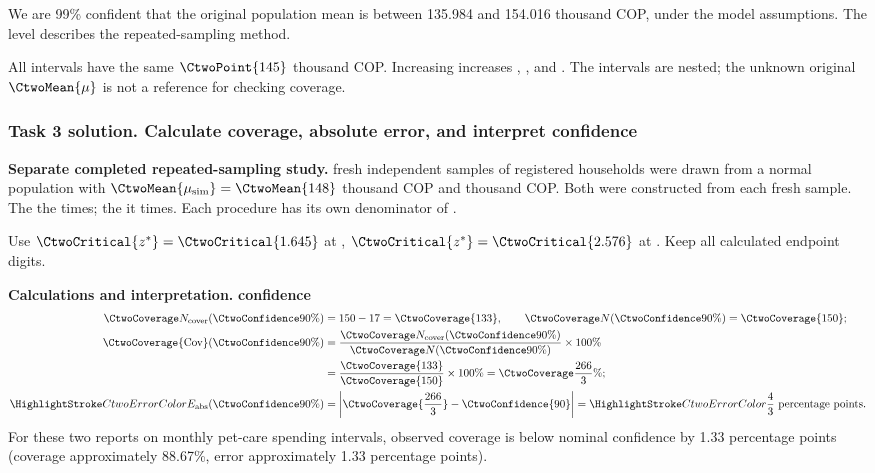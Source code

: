 We are 99\% confident that the original population mean is between 135.984 and 154.016 thousand COP, under the model assumptions. The level describes the repeated-sampling method.

All intervals have the same  $\CtwoPoint{145}$ thousand COP. Increasing  increases , , and . The intervals are nested; the unknown original $\CtwoMean{\mu}$ is not a reference for checking coverage.
\par\vspace{3mm}
\clearpage
\subsubsection*{Task 3 solution. Calculate coverage, absolute error, and interpret confidence}
\label{sol:c2-2-c}
\textbf{Separate completed repeated-sampling study.}  fresh independent samples of  registered households were drawn from a normal population with  $\CtwoMean{\mu_{\rm sim}}=\CtwoMean{148}$ thousand COP and   thousand COP. Both  were constructed from each fresh sample.
The    the   times; the    it  times. Each procedure has its own denominator of .

Use $\CtwoCritical{z^*}=\CtwoCritical{1.645}$ at , $\CtwoCritical{z^*}=\CtwoCritical{2.576}$ at . Keep all calculated endpoint digits.

\textbf{Calculations and interpretation.}
\textbf{ confidence}\nopagebreak[4]
\begin{align*}
\CtwoCoverCount(\CtwoConfidence{90\%})&=150-17=\CtwoCoverage{133},
\qquad\CtwoTotalCount(\CtwoConfidence{90\%})=\CtwoCoverage{150};\\
\CtwoCoverage{\mathrm{Cov}}(\CtwoConfidence{90\%})
&=\frac{\CtwoCoverCount(\CtwoConfidence{90\%})}{\CtwoTotalCount(\CtwoConfidence{90\%})}\times100\%
\\
&=\frac{\CtwoCoverage{133}}{\CtwoCoverage{150}}\times100\%=\CtwoCoverage{\frac{266}{3}\%};\\
\CtwoError{E_{\rm abs}}(\CtwoConfidence{90\%})
&=\left|\CtwoCoverage{\frac{266}{3}}-\CtwoConfidence{90}\right|=\CtwoError{\frac{4}{3}}\ \text{percentage points}.
\end{align*}
For these two reports on monthly pet-care spending intervals, observed coverage is below nominal confidence by 1.33 percentage points (coverage approximately 88.67\%, error approximately 1.33 percentage points).

